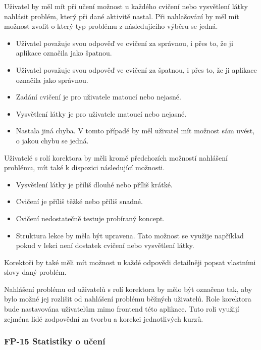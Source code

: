 Uživatel by měl mít při učení možnost u každého cvičení nebo vysvětlení látky nahlásit problém, který při dané aktivitě nastal. Při nahlašování by měl mít možnost zvolit o který typ problému z následujícího výběru se jedná.

\begin{itemize}
    \item Uživatel považuje svou odpověď ve cvičení za správnou, i přes to, že ji aplikace označila jako špatnou.
    \item Uživatel považuje svou odpověď ve cvičení za špatnou, i přes to, že ji aplikace označila jako správnou.
    \item Zadání cvičení je pro uživatele matoucí nebo nejasné.
    \item Vysvětlení látky je pro uživatele matoucí nebo nejasné.
    \item Nastala jiná chyba. V tomto případě by měl uživatel mít možnost sám uvést, o jakou chybu se jedná.
\end{itemize}

Uživatelé s rolí korektora by měli kromě předchozích možností nahlášení problému, mít také k dispozici následující možnosti.

\begin{itemize}
    \item Vysvětlení látky je příliš dlouhé nebo příliš krátké.
    \item Cvičení je příliš těžké nebo příliš snadné.
    \item Cvičení nedostatečně testuje probíraný koncept.
    \item Struktura lekce by měla být upravena. Tato možnost se využije například pokud v lekci není dostatek cvičení nebo vysvětlení látky.
\end{itemize}

Korektoři by také měli mít možnost u každé odpovědi detailněji popsat vlastními slovy daný problém. 

Nahlášení problému od uživatelů s rolí korektora by mělo být označeno tak, aby bylo možné jej rozlišit od nahlášení problému běžných uživatelů. Role korektora bude nastavována uživatelům mimo frontend této aplikace. Tuto roli využijí zejména lidé zodpovědní za tvorbu a korekci jednotlivých kurzů.

\subsubsection{FP-15 Statistiky o učení}

